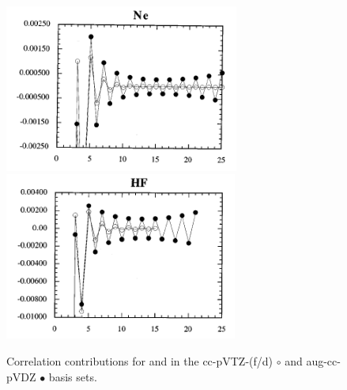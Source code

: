 \documentclass[11pt,a4paper]{article}
\begin{document}
\begin{figure}[h!]
    \includegraphics[height=5.5cm]{Nedivergence.png}
    \hfill
    \includegraphics[height=5.5cm]{HFdivergence.png}
    \hfill
    \caption{\centering Correlation contributions for  and  in the cc-pVTZ-(f/d) $\circ$ and aug-cc-pVDZ $\bullet$ basis sets.}
    \label{fig:my_label}
\end{figure}
 
\end{document}
